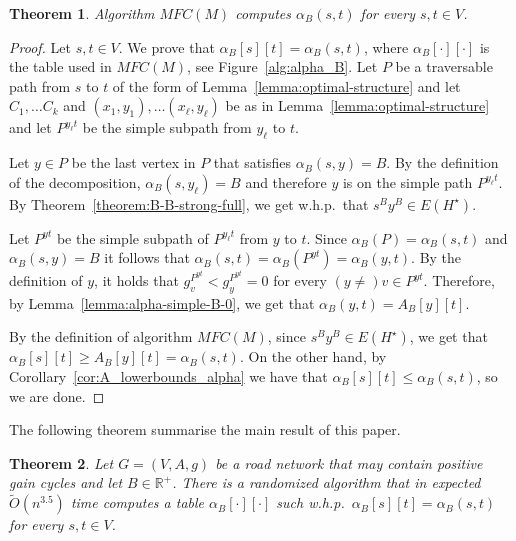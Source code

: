 \documentclass[11pt]{article}
\newtheorem{theorem}{Theorem}[section]
\newcommand{\RR}{\mathbb{R}}
\begin{document}
\begin{theorem}\label{theorem:alpha-correctness}
    Algorithm $MFC(M)$ computes $\alpha_B(s,t)$ for every $s,t\in V$.
\end{theorem}

\begin{proof}
    Let $s,t\in V$. We prove that $\alpha_B[s][t] =\alpha_B(s,t)$, where $\alpha_B[\cdot][\cdot]$ is the table used in $MFC(M)$, see Figure~\ref{alg:alpha_B}.
    Let $P$ be a traversable path from $s$ to $t$ of the form of Lemma~\ref{lemma:optimal-structure} and let $C_1, \ldots C_k$ and $(x_1,y_1),\ldots(x_{\ell},y_{\ell})$ be as in Lemma~\ref{lemma:optimal-structure} and let $P^{y_{\ell} t}$ be the simple subpath from $y_{\ell}$ to $t$.

    Let $y\in P$ be the last vertex in $P$ that satisfies $\alpha_B(s,y) = B$. By the definition of the decomposition, $\alpha_B(s,y_{\ell}) = B$ and therefore $y$ 
    is on the simple path $P^{y_\ell t}$.
    By Theorem~\ref{theorem:B-B-strong-full}, we get w.h.p.\ that $s^B y^B \in E(H^\star)$.

    Let $P^{y t}$ be the simple subpath of $P^{y_{\ell} t}$ from $y$ to $t$. Since $\alpha_B(P)= \alpha_B(s,t)$ and $\alpha_B(s,y)= B$  it follows that $ \alpha_B(s,t) = \alpha_B(P^{y t}) = \alpha_B(y,t)$.
    By the definition of $y$, it holds that $g^{P^{y t}}_v < g^{P^{y t}}_y = 0$ for every $(y\neq) v \in P^{y t}$. Therefore, by Lemma~\ref{lemma:alpha-simple-B-0}, we get that $\alpha_B(y,t) = A_B[y][t]$. 
    
    By the definition of algorithm $MFC(M)$, since $s^B y^B \in E(H^\star)$, we get that $\alpha_B[s][t] \ge  A_B[y][t] = \alpha_B(s,t)$. 
    On the other hand, by Corollary~\ref{cor:A_lowerbounds_alpha} we have that $\alpha_B[s][t] \le \alpha_B(s,t)$, so we are done.
\end{proof}

The following theorem summarise the main result of this paper.

\begin{theorem}
    Let $G = (V,A,g)$ be a road network that may contain positive gain cycles and let $B \in \RR^{+}$. There is a randomized algorithm that in expected $\tilde{O}(n^{3.5})$ time computes a table $\alpha_B[\cdot][\cdot]$ such w.h.p.\ $\alpha_B[s][t] = \alpha_B(s,t)$ for every $s,t\in V$.
\end{theorem}
\end{document}

